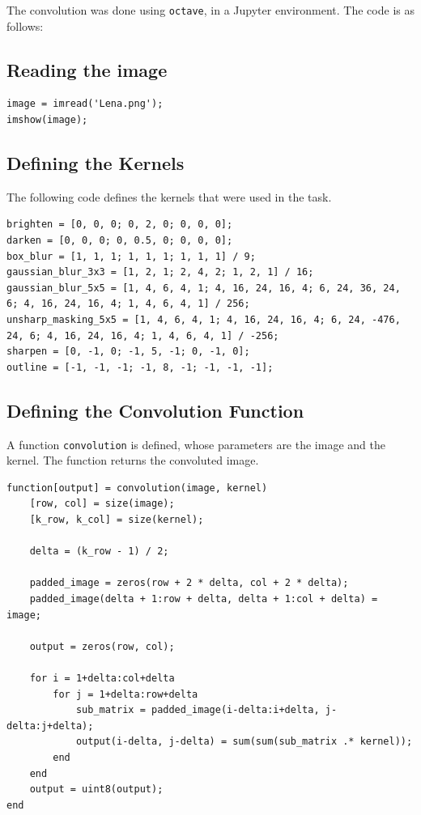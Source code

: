 \documentclass[12pt]{report}
\begin{document}
The convolution was done using \texttt{octave}, in a Jupyter environment. The code is as follows:

\subsection{Reading the image}

\begin{lstlisting}[caption={Reading the image}]
image = imread('Lena.png');
imshow(image);
\end{lstlisting}

\subsection{Defining the Kernels}
The following code defines the kernels \cite{enwiki:kernel} that were used in the task.


\begin{lstlisting}[caption={Defining the Kernels}]
brighten = [0, 0, 0; 0, 2, 0; 0, 0, 0];
darken = [0, 0, 0; 0, 0.5, 0; 0, 0, 0];
box_blur = [1, 1, 1; 1, 1, 1; 1, 1, 1] / 9;
gaussian_blur_3x3 = [1, 2, 1; 2, 4, 2; 1, 2, 1] / 16;
gaussian_blur_5x5 = [1, 4, 6, 4, 1; 4, 16, 24, 16, 4; 6, 24, 36, 24, 6; 4, 16, 24, 16, 4; 1, 4, 6, 4, 1] / 256;
unsharp_masking_5x5 = [1, 4, 6, 4, 1; 4, 16, 24, 16, 4; 6, 24, -476, 24, 6; 4, 16, 24, 16, 4; 1, 4, 6, 4, 1] / -256;
sharpen = [0, -1, 0; -1, 5, -1; 0, -1, 0];
outline = [-1, -1, -1; -1, 8, -1; -1, -1, -1];
\end{lstlisting}

\subsection{Defining the Convolution Function}
A function \texttt{convolution} is defined, whose parameters are the image and the kernel. The function returns the convoluted image.

\begin{lstlisting}[caption={The Convolution Function}]
function[output] = convolution(image, kernel)
    [row, col] = size(image);
    [k_row, k_col] = size(kernel);

    delta = (k_row - 1) / 2;
    
    padded_image = zeros(row + 2 * delta, col + 2 * delta);
    padded_image(delta + 1:row + delta, delta + 1:col + delta) = image;

    output = zeros(row, col);

    for i = 1+delta:col+delta
        for j = 1+delta:row+delta
            sub_matrix = padded_image(i-delta:i+delta, j-delta:j+delta);
            output(i-delta, j-delta) = sum(sum(sub_matrix .* kernel));
        end
    end
    output = uint8(output);
end
\end{lstlisting}
\end{document}
